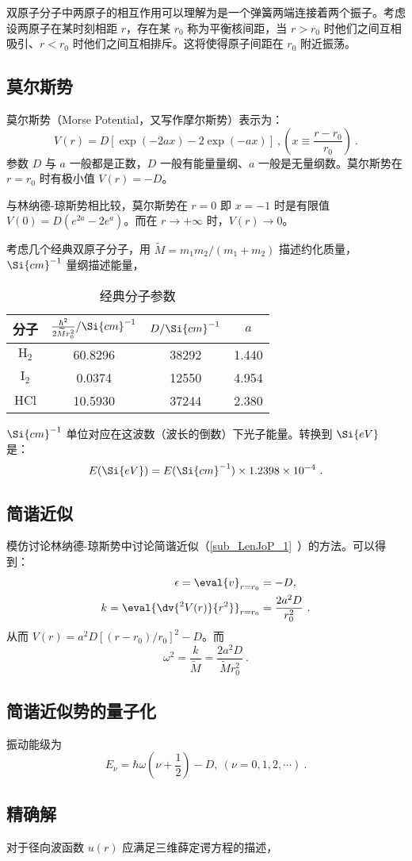 

双原子分子中两原子的相互作用可以理解为是一个弹簧两端连接着两个振子。考虑设两原子在某时刻相距 $r$，存在某 $r_0$ 称为平衡核间距，当 $r>r_0$ 时他们之间互相吸引、$r<r_0$ 时他们之间互相排斥。这将使得原子间距在 $r_0$ 附近振荡。

\subsection{莫尔斯势}
莫尔斯势（Morse Potential，又写作摩尔斯势）表示为：
\begin{equation}
V(r) = D [\exp(-2ax) - 2\exp(-ax)] \ , \left(x \equiv \frac{r-r_0}{r_0}\right)~.
\end{equation}
参数 $D$ 与 $a$ 一般都是正数，$D$ 一般有能量量纲、$a$ 一般是无量纲数。莫尔斯势在 $r=r_0$ 时有极小值 $V(r)=-D$。

与林纳德-琼斯势相比较，莫尔斯势在 $r = 0$ 即 $x = -1$ 时是有限值 $V(0) = D(e^{2a}-2e^{a})$。而在 $r \rightarrow +\infty$ 时，$V(r) \rightarrow 0$。

考虑几个经典双原子分子，用 $\widetilde{M} = m_1m_2/(m_1+m_2)$ 描述约化质量，$\Si{cm}^{-1}$ 量纲描述能量，
\begin{table}[ht]
\centering
\caption{经典分子参数}\label{tab_MoPoQM1}
\begin{tabular}{|c|c|c|c|}
\hline
分子 & $\frac{\hbar^2}{2 \widetilde{M} r_0^2}/\Si{cm}^{-1}$ & $D/\Si{cm}^{-1}$ & $a$ \\
\hline
$\text{H}_2$ & 60.8296 & 38292 & 1.440 \\
\hline
$\text{I}_2$ & 0.0374 & 12550 & 4.954 \\
\hline
$\text{HCl}$ & 10.5930 & 37244 & 2.380 \\
\hline
\end{tabular}
\end{table}
$\Si{cm}^{-1}$ 单位对应在这波数（波长的倒数）下光子能量。转换到 $\Si{eV}$ 是：
$$E(\Si{eV}) = E(\Si{cm}^{-1}) \times 1.2398 \times 10^{-4} ~.$$

\subsection{简谐近似}
模仿讨论林纳德-琼斯势中讨论简谐近似（\autoref{sub_LenJoP_1}~）的方法。可以得到：
\begin{equation}
\begin{aligned}
\epsilon = \eval{v}_{r = r_0}& = -D ,\\
k = \eval{\dv{^2 V(r)}{r^2}}_{r = r_0}& = \frac{2a^2 D}{r_0^2} ~.
\end{aligned}
\end{equation}
从而 $V(r) = a^2 D[(r-r_0)/r_0]^2 - D$。而 
$$\omega^2 = \frac{k}{\widetilde M} = \frac{2a^2D}{\widetilde Mr_0^2} ~.$$

\subsection{简谐近似势的量子化}
振动能级为
$$E_\nu = \hbar \omega (\nu + \frac12) - D , \ (\nu = 0, 1, 2, \cdots) ~.$$

\subsection{精确解}
对于径向波函数 $u(r)$ 应满足三维薛定谔方程的描述，